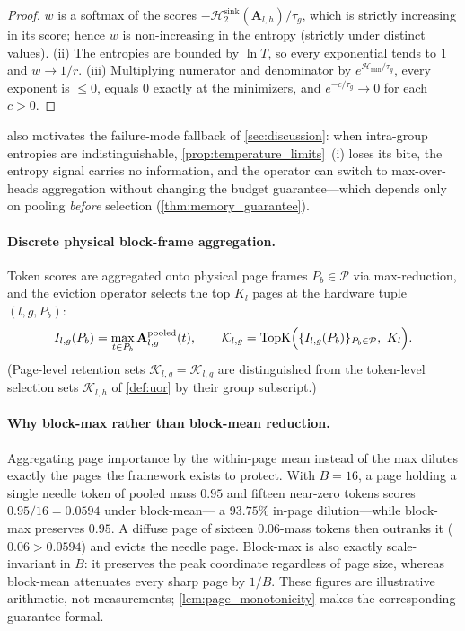 \documentclass[final,5p,times,twocolumn]{elsarticle}
\theoremstyle{definition}
\theoremstyle{remark}
\newcommand{\Attn}[2]{\mathbf{A}_{#1,#2}}
\newcommand{\AttnPool}[2]{\mathbf{A}^{\mathrm{pooled}}_{#1,#2}}
\newcommand{\CollisionSink}[1]{\mathcal{H}^{\mathrm{sink}}_{2}\!\left(#1\right)}
\newcommand{\PageSet}{\mathcal{P}}
\newcommand{\RetSet}[2]{\mathcal{K}_{#1,#2}}
\newcommand{\TokSet}[1]{\mathcal{K}_{l,#1}}
\newcommand{\PageImp}[3]{I_{#1,#2}(P_{#3})}
\begin{document}
\begin{proof}
 $w$ is a softmax of the scores
 $-\CollisionSink{\Attn{l}{h}}/\tau_g$, which is strictly increasing in
its score; hence $w$ is non-increasing in the entropy (strictly under
distinct values). (ii) The entropies are bounded by $\ln T$, so every
exponential tends to $1$ and $w \to 1/r$. (iii) Multiplying numerator
and denominator by $e^{\mathcal{H}_{\min}/\tau_g}$, every exponent is
 $\le 0$, equals $0$ exactly at the minimizers, and
 $e^{-c/\tau_g} \to 0$ for each $c>0$.
\end{proof}

 also motivates the failure-mode fallback
of \cref{sec:discussion}: when intra-group entropies are
indistinguishable, \cref{prop:temperature_limits}~(i) loses its bite,
the entropy signal carries no information, and the operator can switch
to max-over-heads aggregation without changing the budget
guarantee---which depends only on pooling \emph{before} selection
(\cref{thm:memory_guarantee}).

\paragraph{Discrete physical block-frame aggregation.}
Token scores are aggregated onto physical page frames
 $P_b \in \PageSet$ via max-reduction, and the eviction operator selects
the top $K_l$ pages at the hardware tuple $(l,g,P_b)$:
\begin{equation}
\PageImp{l}{g}{b}
= \max_{t \in P_b} \AttnPool{l}{g}(t),
\qquad
\RetSet{l}{g}
= \mathrm{TopK}\Bigl(\{I_{l,g}(P_b)\}_{P_b \in \PageSet},\ K_l\Bigr).
\label{eq:page_aggregation}
\end{equation}
(Page-level retention sets $\RetSet{l}{g}=\mathcal{K}_{l,g}$ are
distinguished from the token-level selection sets $\TokSet{h}$ of
\cref{def:uor} by their group subscript.)

\paragraph{Why block-max rather than block-mean reduction.}
Aggregating page importance by the within-page mean instead of the max
dilutes exactly the pages the framework exists to protect. With
 $B=16$, a page holding a single needle token of pooled mass $0.95$ and
fifteen near-zero tokens scores $0.95/16 = 0.0594$ under block-mean---%
a $93.75\%$ in-page dilution---while block-max preserves $0.95$. A
diffuse page of sixteen $0.06$-mass tokens then outranks it
($0.06 > 0.0594$) and evicts the needle page. Block-max is also exactly
scale-invariant in $B$: it preserves the peak coordinate regardless of
page size, whereas block-mean attenuates every sharp page by $1/B$.
These figures are illustrative arithmetic, not measurements;
\cref{lem:page_monotonicity} makes the corresponding guarantee formal.
\end{document}
